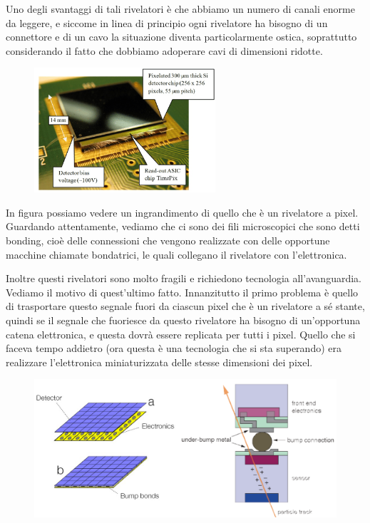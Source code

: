 Uno degli svantaggi di tali rivelatori è che abbiamo un numero di canali enorme da leggere, e siccome in linea di principio ogni rivelatore ha bisogno di un connettore e di un cavo la situazione diventa particolarmente ostica, soprattutto considerando il fatto che dobbiamo adoperare cavi di dimensioni ridotte.
\begin{figure}[H]
   \centering
   \includegraphics[width=0.6\textwidth]{immagini/zoom_rivelatore_silicio.png}
\end{figure}
In figura possiamo vedere un ingrandimento di quello che è un rivelatore a pixel. Guardando attentamente, vediamo che ci sono dei fili microscopici che sono detti bonding, cioè delle connessioni che vengono realizzate con delle opportune macchine chiamate bondatrici, le quali collegano il rivelatore con l'elettronica.

Inoltre questi rivelatori sono molto fragili e richiedono tecnologia all'avanguardia. Vediamo il motivo di quest'ultimo fatto. Innanzitutto il primo problema è quello di trasportare questo segnale fuori da ciascun pixel che è un rivelatore a sé stante, quindi se il segnale che fuoriesce da questo rivelatore ha bisogno di un'opportuna catena elettronica, e questa dovrà essere replicata per tutti i pixel. Quello che si faceva tempo addietro (ora questa è una tecnologia che si sta superando) era realizzare l'elettronica miniaturizzata delle stesse dimensioni dei pixel.

\begin{figure}[H]
   \centering
   \includegraphics[width=\textwidth]{immagini/connessione_rivelatore_a_pixel.png}
\end{figure}

